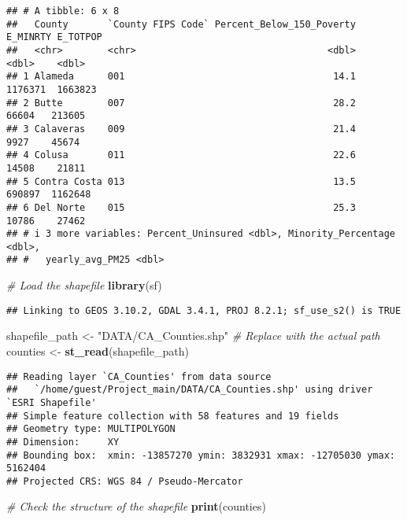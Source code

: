 \documentclass[
]{article}
\newenvironment{Shaded}{\begin{snugshade}}{\end{snugshade}}
\newcommand{\CommentTok}[1]{\textcolor[rgb]{0.56,0.35,0.01}{\textit{#1}}}
\newcommand{\FunctionTok}[1]{\textcolor[rgb]{0.13,0.29,0.53}{\textbf{#1}}}
\newcommand{\NormalTok}[1]{#1}
\newcommand{\OtherTok}[1]{\textcolor[rgb]{0.56,0.35,0.01}{#1}}
\newcommand{\StringTok}[1]{\textcolor[rgb]{0.31,0.60,0.02}{#1}}
\begin{document}
\begin{verbatim}
## # A tibble: 6 x 8
##   County       `County FIPS Code` Percent_Below_150_Poverty E_MINRTY E_TOTPOP
##   <chr>        <chr>                                  <dbl>    <dbl>    <dbl>
## 1 Alameda      001                                     14.1  1176371  1663823
## 2 Butte        007                                     28.2    66604   213605
## 3 Calaveras    009                                     21.4     9927    45674
## 4 Colusa       011                                     22.6    14508    21811
## 5 Contra Costa 013                                     13.5   690897  1162648
## 6 Del Norte    015                                     25.3    10786    27462
## # i 3 more variables: Percent_Uninsured <dbl>, Minority_Percentage <dbl>,
## #   yearly_avg_PM25 <dbl>
\end{verbatim}

\begin{Shaded}
\begin{Highlighting}[]
\CommentTok{\# Load the shapefile}
\FunctionTok{library}\NormalTok{(sf) }
\end{Highlighting}
\end{Shaded}

\begin{verbatim}
## Linking to GEOS 3.10.2, GDAL 3.4.1, PROJ 8.2.1; sf_use_s2() is TRUE
\end{verbatim}

\begin{Shaded}
\begin{Highlighting}[]
\NormalTok{shapefile\_path }\OtherTok{\textless{}{-}} \StringTok{"DATA/CA\_Counties.shp"}  \CommentTok{\# Replace with the actual path}
\NormalTok{counties }\OtherTok{\textless{}{-}} \FunctionTok{st\_read}\NormalTok{(shapefile\_path)}
\end{Highlighting}
\end{Shaded}

\begin{verbatim}
## Reading layer `CA_Counties' from data source 
##   `/home/guest/Project_main/DATA/CA_Counties.shp' using driver `ESRI Shapefile'
## Simple feature collection with 58 features and 19 fields
## Geometry type: MULTIPOLYGON
## Dimension:     XY
## Bounding box:  xmin: -13857270 ymin: 3832931 xmax: -12705030 ymax: 5162404
## Projected CRS: WGS 84 / Pseudo-Mercator
\end{verbatim}

\begin{Shaded}
\begin{Highlighting}[]
\CommentTok{\# Check the structure of the shapefile}
\FunctionTok{print}\NormalTok{(counties)}
\end{Highlighting}
\end{Shaded}
\end{document}

